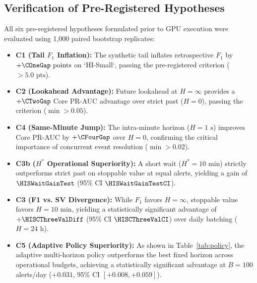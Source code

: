 \documentclass[10pt,twocolumn,letterpaper]{article}
\begin{document}
\subsection{Verification of Pre-Registered Hypotheses}
All six pre-registered hypotheses formulated prior to GPU execution were evaluated using 1,000 paired bootstrap replicates:
\begin{itemize}[leftmargin=*]
    \item \textbf{C1 (Tail $F_1$ Inflation):} The synthetic tail inflates retrospective $F_1$ by \textbf{$+\COneGap\text{ points}$} on `HI-Small`, passing the pre-registered criterion ($>5.0\text{ pts}$).
    \item \textbf{C2 (Lookahead Advantage):} Future lookahead at $H=\infty$ provides a \textbf{$+\CTwoGap$} Core PR-AUC advantage over strict past ($H=0$), passing the criterion ($\min > 0.05$).
    \item \textbf{C4 (Same-Minute Jump):} The intra-minute horizon ($H=1\text{ s}$) improves Core PR-AUC by \textbf{$+\CFourGap$} over $H=0$, confirming the critical importance of concurrent event resolution ($\min > 0.02$).
    \item \textbf{C3b ($H^*$ Operational Superiority):} A short wait ($H^* = 10\text{ min}$) strictly outperforms strict past on stoppable value at equal alerts, yielding a gain of \textbf{$\HISWaitGainTest$} (95\% CI $\HISWaitGainTestCI$).
    \item \textbf{C3 (F1 vs. SV Divergence):} While $F_1$ favors $H=\infty$, stoppable value favors $H=10\text{ min}$, yielding a statistically significant advantage of \textbf{$+\HISCThreeValDiff$} (95\% CI $\HISCThreeValCI$) over daily batching ($H=24\text{ h}$).
    \item \textbf{C5 (Adaptive Policy Superiority):} As shown in Table~\ref{tab:policy}, the adaptive multi-horizon policy outperforms the best fixed horizon across operational budgets, achieving a statistically significant advantage at $B=100$ alerts/day ($+0.031$, 95\% CI $[+0.008, +0.059]$).
\end{itemize}

\begin{table}[ht]
\centering
\small
\caption{\textbf{Adaptive Multi-Horizon Alerting Policy vs. Best Fixed Horizon.} Comparison of stoppable value ($\text{SV}$) across daily alert budgets with 95\% bootstrap confidence intervals.}
\label{tab:policy}
\resizebox{\columnwidth}{!}{%
%
}
\end{table}
\end{document}
